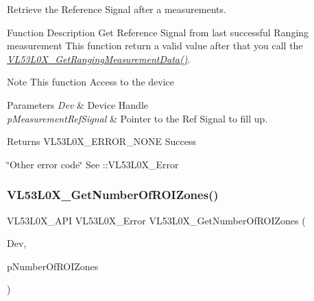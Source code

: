 Retrieve the Reference Signal after a measurements. 

\begin{DoxyParagraph}{Function Description}
Get Reference Signal from last successful Ranging measurement This function return a valid value after that you call the {\itshape \hyperlink{group__VL53L0X__measurement__group_ga2ed3769943964e7c24f3c8a06ef14ad7}{V\+L53\+L0\+X\+\_\+\+Get\+Ranging\+Measurement\+Data()}}.
\end{DoxyParagraph}
\begin{DoxyNote}{Note}
This function Access to the device
\end{DoxyNote}

\begin{DoxyParams}{Parameters}
{\em Dev} & Device Handle \\
\hline
{\em p\+Measurement\+Ref\+Signal} & Pointer to the Ref Signal to fill up. \\
\hline
\end{DoxyParams}
\begin{DoxyReturn}{Returns}
V\+L53\+L0\+X\+\_\+\+E\+R\+R\+O\+R\+\_\+\+N\+O\+NE Success 

\char`\"{}\+Other error code\char`\"{} See \+::\+V\+L53\+L0\+X\+\_\+\+Error 
\end{DoxyReturn}
\mbox{\label{group__VL53L0X__measurement__group_gad345958f05c6b130f35c569dd0d0e4f8}} 
\subsubsection{\texorpdfstring{V\+L53\+L0\+X\+\_\+\+Get\+Number\+Of\+R\+O\+I\+Zones()}{VL53L0X\_GetNumberOfROIZones()}}
{\footnotesize\ttfamily V\+L53\+L0\+X\+\_\+\+A\+PI V\+L53\+L0\+X\+\_\+\+Error V\+L53\+L0\+X\+\_\+\+Get\+Number\+Of\+R\+O\+I\+Zones (\begin{DoxyParamCaption}\item[{\hyperlink{group__VL53L0X__platform__group_ga2d6405308b1dd524b462f1b8fb97d167}{V\+L53\+L0\+X\+\_\+\+D\+EV}}]{Dev,  }\item[{\hyperlink{vl53l0x__types_8h_aba7bc1797add20fe3efdf37ced1182c5}{uint8\+\_\+t} $\ast$}]{p\+Number\+Of\+R\+O\+I\+Zones }\end{DoxyParamCaption})}




